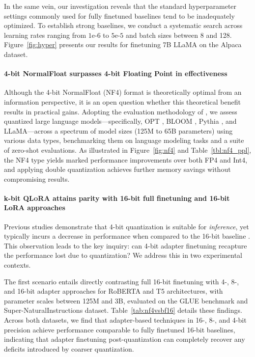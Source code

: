 In the same vein, our investigation reveals that the standard hyperparameter settings commonly used for fully finetuned baselines tend to be inadequately optimized. To establish strong baselines, we conduct a systematic search across learning rates ranging from $1\text{e-}6$ to $5\text{e-}5$ and batch sizes between 8 and 128. Figure~\ref{fig:hyper} presents our results for finetuning 7B LLaMA on the Alpaca dataset.

\paragraph{4-bit NormalFloat surpasses 4-bit Floating Point in effectiveness} 

Although the 4-bit NormalFloat (NF4) format is theoretically optimal from an information perspective, it is an open question whether this theoretical benefit results in practical gains. Adopting the evaluation methodology of \citet{dettmers2022case}, we assess quantized large language models—specifically, OPT \citep{zhang2022opt}, BLOOM \cite{scao2022bloom}, Pythia \cite{biderman2023pythia}, and LLaMA—across a spectrum of model sizes (125M to 65B parameters) using various data types, benchmarking them on language modeling tasks and a suite of zero-shot evaluations. As illustrated in Figure~\ref{fig:nf4} and Table~\ref{tbl:nf4_ppl}, the NF4 type yields marked performance improvements over both FP4 and Int4, and applying double quantization achieves further memory savings without compromising results.

\paragraph{k-bit \textsc{QLoRA} attains parity with 16-bit full finetuning and 16-bit LoRA approaches} 

Previous studies demonstrate that 4-bit quantization is suitable for \emph{inference}, yet typically incurs a decrease in performance when compared to the 16-bit baseline \citep{dettmers2022case,frantar2022gptq}. This observation leads to the key inquiry: can 4-bit adapter finetuning recapture the performance lost due to quantization? We address this in two experimental contexts.

The first scenario entails directly contrasting full 16-bit finetuning with 4-, 8-, and 16-bit adapter approaches for RoBERTA and T5 architectures, with parameter scales between 125M and 3B, evaluated on the GLUE benchmark and Super-NaturalInstructions dataset. Table~\ref{tab:nf4vsbf16} details these findings. Across both datasets, we find that adapter-based techniques in 16-, 8-, and 4-bit precision achieve performance comparable to fully finetuned 16-bit baselines, indicating that adapter finetuning post-quantization can completely recover any deficits introduced by coarser quantization.

